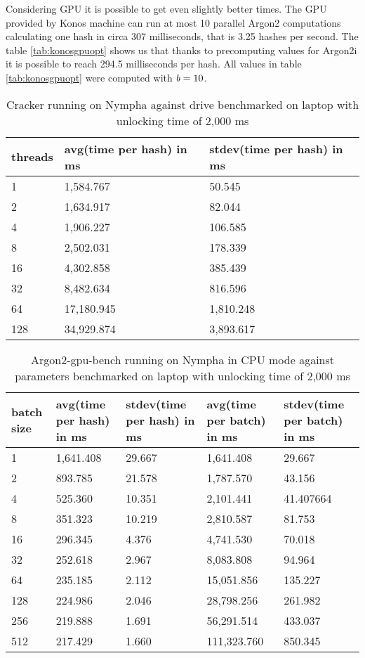 \documentclass[nolof]{fithesis3}
\begin{document}
Considering GPU it is possible to get even slightly better times. The GPU provided by Konos machine can run at most 10 parallel Argon2 computations calculating one hash in circa 307 milliseconds, that is 3.25 hashes per second. The table \ref{tab:konosgpuopt} shows us that thanks to precomputing values for Argon2i it is possible to reach 294.5 milliseconds per hash. All values in table \ref{tab:konosgpuopt} were computed with $\emph{b} = 10$.

\noindent
\begin{table}
\caption{Cracker running on Nympha against drive benchmarked on laptop with unlocking time of 2,000 ms}
\label{tab:nymphacracker}
\begin{tabularx}{\textwidth}{| X | X | X |}
\hline
threads & avg(time per hash) in ms & stdev(time per hash) in ms\\
\hline
1 & 1,584.767 & 50.545\\
\hline
2 & 1,634.917 & 82.044\\
\hline
4 & 1,906.227 & 106.585\\
\hline
8 & 2,502.031 & 178.339\\
\hline
16 & 4,302.858 & 385.439\\
\hline
32 & 8,482.634 & 816.596\\
\hline
64 & 17,180.945 & 1,810.248\\
\hline
128 & 34,929.874 & 3,893.617\\
\hline
\end{tabularx}
\end{table}

\noindent
\begin{table}
\caption{Argon2-gpu-bench running on Nympha in CPU mode against parameters benchmarked on laptop with unlocking time of 2,000 ms}
\label{tab:nymphacpu}
\begin{tabularx}{\textwidth}{| X | X | X | X | X |}
\hline
batch size & avg(time per hash) in ms & stdev(time per hash) in ms & avg(time per batch) in ms & stdev(time per batch) in ms\\
\hline
1 & 1,641.408 & 29.667 & 1,641.408 & 29.667\\
\hline
2 & 893.785 & 21.578 & 1,787.570 & 43.156\\
\hline
4 & 525.360 & 10.351 & 2,101.441 & 41.407664\\
\hline
8 & 351.323 & 10.219 & 2,810.587 & 81.753\\
\hline
16 & 296.345 & 4.376 & 4,741.530 & 70.018\\
\hline
32 & 252.618 & 2.967 & 8,083.808 & 94.964\\
\hline
64 & 235.185 & 2.112 & 15,051.856 & 135.227\\
\hline
128 & 224.986 & 2.046 & 28,798.256 & 261.982\\
\hline
256 & 219.888 & 1.691 & 56,291.514 & 433.037\\
\hline
512 & 217.429 & 1.660 & 111,323.760 & 850.345\\
\hline
\end{tabularx}
\end{table}
\end{document}
